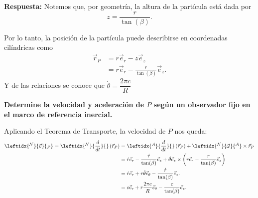 \begin{tcolorbox}[title=Arbol de Navidad,breakable]
\begin{center}
\end{center}
\textbf{Respuesta:} Notemos que, por geometría, la altura de la partícula está dada por
        \begin{equation}
            z = \frac{r}{\tan (\beta)}.
        \end{equation}
        
        Por lo tanto, la posición de la partícula puede describirse en coordenadas cilíndricas como
        \begin{align}
            \vec{r}_P &= r\vec{e}_{r} - z\vec{e}_z \\
                &= r\vec{e}_{r} - \frac{r}{\tan (\beta)} \vec{e}_z .
        \end{align}
Y de las relaciones se conoce que $\dot\theta=\dfrac{2\pi c}{R}$


       

\textbf{Determine la  velocidad y aceleración de $P$ según un observador fijo en el marco de referencia inercial.}



 Aplicando el Teorema de Transporte, la velocidad de $P$ nos queda:
        \begin{align*}
            \leftidx{^{\mathcal{N}}}{\vec{v}}{_P} = \leftidx{^{\mathcal{N}}}{\frac{d}{dt}}{} \left( \vec{r}_P \right) &=  \leftidx{^{\mathcal{A}}}{\frac{d}{dt}}{} \left( \vec{r}_P \right) + \leftidx{^{\mathcal{N}}}{\vec{\omega}}{^{\mathcal{A}}} \times \vec{r}_P \\
                &= \dot{r}\vec{e}_{r} - \frac{\dot{r}}{\tan (\beta)} \vec{e}_z + \dot{\theta} \vec{e}_z \times \left( r\vec{e}_{r} - \frac{r}{\tan (\beta)} \vec{e}_z \right) \\
                &= \dot{r}\vec{e}_{r} + r\dot{\theta} \vec{e}_{\theta} - \frac{\dot{r}}{\tan (\beta)} \vec{e}_z .\\
                &= c\vec{e}_{r} + r\dfrac{2\pi c}{R} \vec{e}_{\theta} - \frac{c}{\tan (\beta)} \vec{e}_z .
        \end{align*}


\end{tcolorbox}
